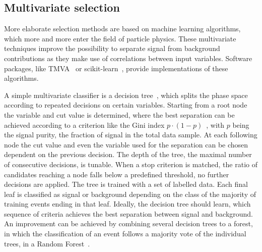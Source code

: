 
\subsection{Multivariate selection}
\label{sec:dataanalysis:selection:bdt}

More elaborate selection methods are based on machine learning algorithms,
which more and more enter the field of particle physics. These multivariate
techniques improve the possibility to separate signal from background
contributions as they make use of correlations between input variables.
Software packages, like TMVA~\cite{Hocker:2007ht} or
scikit-learn~\cite{scikit-learn}, provide implementations of these algorithms.

A simple multivariate classifier is a decision tree~\cite{Breiman}, which
splits the phase space according to repeated decisions on certain variables.
Starting from a root node the variable and cut value is determined, where the
best separation can be achieved according to a criterion like the Gini
index $p \cdot (1-p)$~\cite{giniindex}, with $p$ being the signal purity, \ie
the fraction of signal in the total data sample. At each following node the
cut value and even the variable used for the separation can be chosen
dependent on the previous decision. The depth of the tree, \ie the maximal
number of consecutive decisions, is tunable. When a stop criterion is matched,
\eg the ratio of candidates reaching a node falls below a predefined
threshold, no further decisions are applied. The tree is trained with a set of
labelled data. Each final leaf is classified as signal or background depending
on the class of the majority of training events ending in that leaf. Ideally,
the decision tree should learn, which sequence of criteria achieves the best
separation between signal and background. An improvement can be achieved by
combining several decision trees to a forest, in which the classification of
an event follows a majority vote of the individual trees, \eg in a Random
Forest~\cite{RandomForest}.

